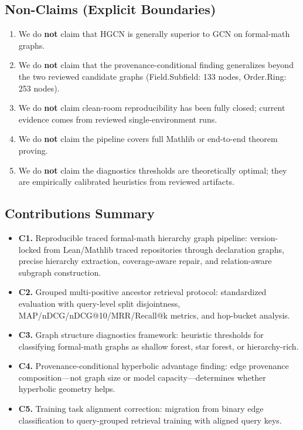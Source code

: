 \documentclass[runningheads]{llncs}
\begin{document}
\subsection{Non-Claims (Explicit Boundaries)}

\begin{enumerate}
\item We do \textbf{not} claim that HGCN is generally superior to GCN on formal-math graphs.
\item We do \textbf{not} claim that the provenance-conditional finding generalizes beyond the two reviewed candidate graphs (Field.Subfield: 133 nodes, Order.Ring: 253 nodes).
\item We do \textbf{not} claim clean-room reproducibility has been fully closed; current evidence comes from reviewed single-environment runs.
\item We do \textbf{not} claim the pipeline covers full Mathlib or end-to-end theorem proving.
\item We do \textbf{not} claim the diagnostics thresholds are theoretically optimal; they are empirically calibrated heuristics from reviewed artifacts.
\end{enumerate}

\subsection{Contributions Summary}

\begin{itemize}
\item \textbf{C1.} Reproducible traced formal-math hierarchy graph pipeline: version-locked from Lean/Mathlib traced repositories through declaration graphs, precise hierarchy extraction, coverage-aware repair, and relation-aware subgraph construction.
\item \textbf{C2.} Grouped multi-positive ancestor retrieval protocol: standardized evaluation with query-level split disjointness, MAP/nDCG/nDCG@10/MRR/Recall@k metrics, and hop-bucket analysis.
\item \textbf{C3.} Graph structure diagnostics framework: heuristic thresholds for classifying formal-math graphs as shallow forest, star forest, or hierarchy-rich.
\item \textbf{C4.} Provenance-conditional hyperbolic advantage finding: edge provenance composition---not graph size or model capacity---determines whether hyperbolic geometry helps.
\item \textbf{C5.} Training task alignment correction: migration from binary edge classification to query-grouped retrieval training with aligned query keys.
\end{itemize}
\end{document}
